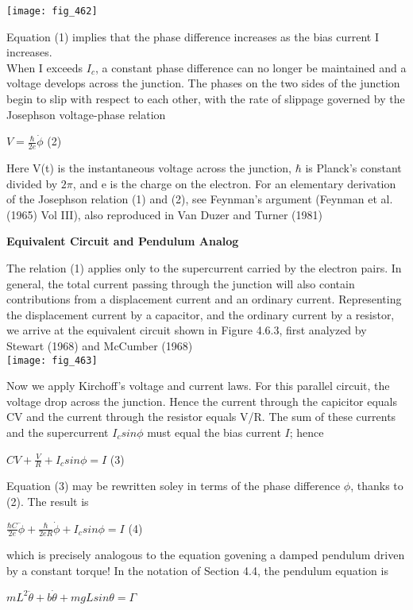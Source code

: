 \documentclass{article}
\newcommand\tab[1][1cm]{\hspace*{#1}}
\begin{document}
\texttt{[image: fig\_462]}

Equation (1) implies that the phase difference increases as the bias current I increases. \\ \tab
When I exceeds $I_{c}$, a constant phase difference can no longer be maintained and a voltage develops across the junction. The phases on the two sides of the junction begin to slip with respect to each other, with the rate of slippage governed by the Josephson voltage-phase relation
\begin{center}
$V=\frac{\hbar}{2e}\dot{\phi}$ \tab (2)
\end{center}
Here V(t) is the instantaneous voltage across the junction, $\hbar$ is Planck's constant divided by $2\pi$, and e is the charge on the electron. For an elementary derivation of the Josephson relation (1) and (2), see Feynman's argument (Feynman et al. (1965) Vol III), also reproduced in Van Duzer and Turner (1981) 

\textbf {Equivalent Circuit and Pendulum Analog}

The relation (1) applies only to the supercurrent carried by the electron pairs. In general, the total current passing through the junction will also contain contributions from a displacement current and an ordinary current. Representing the displacement current by a capacitor, and the ordinary current by a resistor, we arrive at the equivalent circuit shown in Figure 4.6.3, first analyzed by Stewart (1968) and McCumber (1968) \\

\texttt{[image: fig\_463]}

Now we apply Kirchoff's voltage and current laws. For this parallel circuit, the voltage drop across the junction. Hence the current through the capicitor equals CV and the current through the resistor equals V/R. The sum of these currents and the supercurrent $I_{c}sin\phi$ must equal the bias current $I$; hence 
\begin{center}
$CV+\frac{V}{R}+I_{c}sin\phi=I$ \tab (3)
\end{center}
Equation (3) may be rewritten soley in terms of the phase difference $\phi$, thanks to (2). The result is

\begin{center}
$\frac{\hbar{C}}{2e}\ddot{\phi} + \frac{\hbar}{2eR} \dot{\phi} +I_{c} sin\phi = I$ \tab (4)
\end{center}

which is precisely analogous to the equation govening a damped pendulum driven by a constant torque! In the notation of Section 4.4, the pendulum equation is
\begin{center}
$mL^{2}\ddot{\theta} + b \dot{\theta} + mgLsin\theta = \Gamma$
\end{center}
\end{document}
